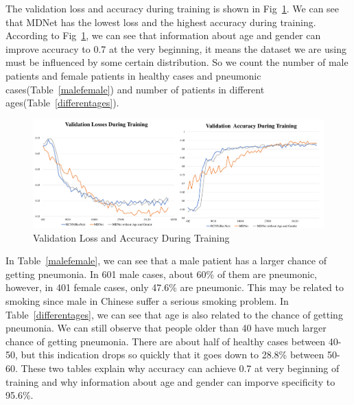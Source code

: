 \documentclass[journal]{IEEEtran}
\begin{document}
The validation loss and accuracy during training is shown in Fig~\ref{loss}. We can see that MDNet has the lowest loss and the highest accuracy during training.
According to Fig~\ref{loss}, we can see that information about age and gender can improve accuracy to 0.7 at the very beginning, it means the dataset we are using must be influenced by some certain distribution. So we count the number of male patients and female patients in healthy cases and pneumonic cases(Table~\ref{malefemale}) and number of patients in different ages(Table~\ref{differentages}). 


\begin{figure}[t]
    \centerline{\includegraphics[width=200mm]{losses.pdf}}
    \vspace{-0cm}
    \caption{Validation Loss and Accuracy During Training}
    \vspace{-0cm}
    \label{loss}
    \end{figure}


In Table~\ref{malefemale}, we can see that a male patient has a larger chance of getting pneumonia. In 601 male cases, about 60\% of them are pneumonic, however, in 401 female cases, only 47.6\% are pneumonic. This may be related to smoking since male in Chinese suffer a serious smoking problem. 
In Table~\ref{differentages}, we can see that age is also related to the chance of getting pneumonia. We can still observe that people older than 40 have much larger chance of getting pneumonia. There are about half of healthy cases between 40-50, but this indication drops so quickly that it goes down to 28.8\% between 50-60. These two tables explain why accuracy can achieve 0.7 at very beginning of training and why information about age and gender can imporve specificity to 95.6\%.
\end{document}
